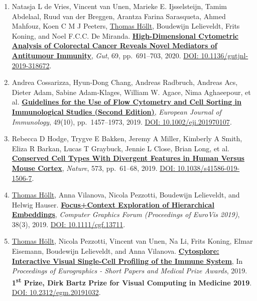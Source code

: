 \documentclass[10pt,a4paper,roman,final]{moderncv}
\newcommand*\highlightauthor[1]{\underline{#1}}
\begin{document}
\begin{enumerate}[leftmargin=0cm,start=2]
\item
Natasja L de Vries, Vincent van Unen, Marieke E. Ijsselsteijn, Tamim Abdelaal, Ruud van der Breggen, Arantza Farina Sarasqueta, Ahmed Mahfouz, Koen C M J Peeters, \highlightauthor{Thomas Höllt}, Boudewijn Lelieveldt, Frits Koning, and Noel F.C.C. De Miranda.
\href{https://www.thomashollt.com/publications/2019_gut_antitumor/}{\textbf{High-Dimensional Cytometric Analysis of Colorectal Cancer Reveals Novel Mediators of Antitumour Immunity}},
\emph{Gut}, 69, pp.~691--703,
2020.
\href{https://doi.org/10.1136/gutjnl-2019-318672}{DOI: 10.1136/\allowbreak gutjnl-2019-318672}.


\item
Andrea Cossarizza, Hyun‐Dong Chang, Andreas Radbruch, Andreas Acs, Dieter Adam, Sabine Adam‐Klages, William W. Agace, Nima Aghaeepour, et al.
\href{https://www.thomashollt.com/publications/2019_cytometry_guidelines/}{\textbf{Guidelines for the Use of Flow Cytometry and Cell Sorting in Immunological Studies (Second Edition)}},
\emph{European Journal of Immunology}, 49(10), pp.~1457--1973,
2019.
\href{https://doi.org/10.1002/eji.201970107}{DOI: 10.1002/\allowbreak eji.201970107}.


\item
Rebecca D Hodge, Trygve E Bakken, Jeremy A Miller, Kimberly A Smith, Eliza R Barkan, Lucas T Graybuck, Jennie L Close, Brian Long, et al.
\href{https://www.thomashollt.com/publications/2019_divergent_cell_types/}{\textbf{Conserved Cell Types With Divergent Features in Human Versus Mouse Cortex}},
\emph{Nature}, 573, pp.~61--68,
2019.
\href{https://doi.org/10.1038/s41586-019-1506-7}{DOI: 10.1038/\allowbreak s41586-019-1506-7}.


\item
\highlightauthor{Thomas Höllt}, Anna Vilanova, Nicola Pezzotti, Boudewijn Lelieveldt, and Helwig Hauser.
\href{https://www.thomashollt.com/publications/2019_eurovis/}{\textbf{Focus+Context Exploration of Hierarchical Embeddings}},
\emph{Computer Graphics Forum (Proceedings of EuroVis 2019)}, 38(3),
2019.
\href{https://doi.org/10.1111/cgf.13711}{DOI: 10.1111/\allowbreak cgf.13711}.


\item
\highlightauthor{Thomas Höllt}, Nicola Pezzotti, Vincent van Unen, Na Li, Frits Koning, Elmar Eisemann, Boudewijn Lelieveldt, and Anna Vilanova.
\href{https://www.thomashollt.com/publications/2019_dirk_bartz_prize/}{\textbf{Cytosplore: Interactive Visual Single-Cell Profiling of the Immune System}},
In \emph{Proceedings of Eurographics - Short Papers and Medical Prize Awards},
2019.
\textbf{1\textsuperscript{st} Prize, Dirk Bartz Prize for Visual Computing in Medicine 2019}.
\href{https://doi.org/10.2312/egm.20191032}{DOI: 10.2312/\allowbreak egm.20191032}.



\end{enumerate}
\end{document}
